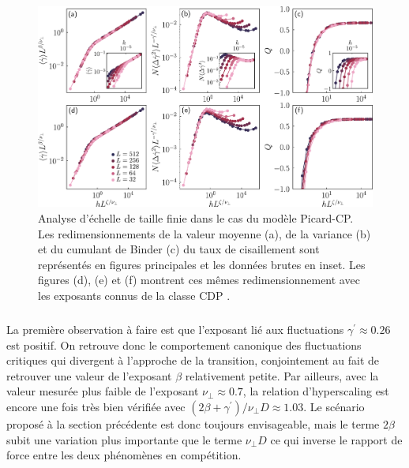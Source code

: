 \begin{figure}[h]
	\centering
	\includegraphics[width=\textwidth]{Chapitre4/Figures/CourtePortee/FSS_SRP_edited.pdf}
	\caption{Analyse d'échelle de taille finie dans le cas du modèle Picard-CP. Les redimensionnements de la valeur moyenne (a), de la variance (b) et du cumulant de Binder (c) du taux de cisaillement sont représentés en figures principales et les données brutes en inset. Les figures (d), (e) et (f) montrent ces mêmes redimensionnement avec les exposants connus de la classe CDP \cite{lubeck_universal_2004}.}
	\label{fig:FSS_SRP}
\end{figure}

\subparagraph{} La première observation à faire est que l'exposant lié aux fluctuations $\gamma^\prime \approx 0.26$ est positif. On retrouve donc le comportement canonique des fluctuations critiques qui divergent à l'approche de la transition, conjointement au fait de retrouver une valeur de l'exposant $\beta$ relativement petite. Par ailleurs, avec la valeur mesurée plus faible de l'exposant $\nu_\perp \approx 0.7$, la relation d'hyperscaling est encore une fois très bien vérifiée avec $(2\beta + \gamma^\prime)/\nu_\perp D \approx 1.03$. Le scénario proposé à la section précédente est donc toujours envisageable, mais le terme $2\beta$ subit une variation plus importante que le terme $\nu_\perp D$ ce qui inverse le rapport de force entre les deux phénomènes en compétition.

